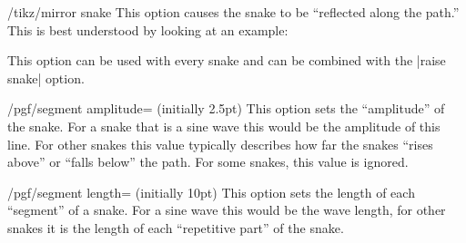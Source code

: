 \begin{key}{/tikz/mirror snake}
  This option causes the snake to be ``reflected along the path.''
  This is best understood by looking at an example:
\begin{codeexample}[]
\end{codeexample}
  This option can be used with every snake and can be combined with
  the |raise snake| option.
\end{key}


\begin{key}{/pgf/segment amplitude= (initially 2.5pt)}
  This option sets the ``amplitude'' of the snake. For a snake that is
  a sine wave this would be the amplitude of this line. For other
  snakes this value typically describes how far the snakes ``rises
  above'' or ``falls below'' the path. For some snakes, this value is
  ignored. 
\begin{codeexample}[]
\end{codeexample}
\end{key}

\begin{key}{/pgf/segment length= (initially 10pt)}
  This option sets the length of each ``segment'' of a snake. For a
  sine wave this would be the wave length, for other snakes it is the
  length of each ``repetitive part'' of the snake.
\begin{codeexample}[]
\end{codeexample}
\begin{codeexample}[]
\end{codeexample}
\end{key}

